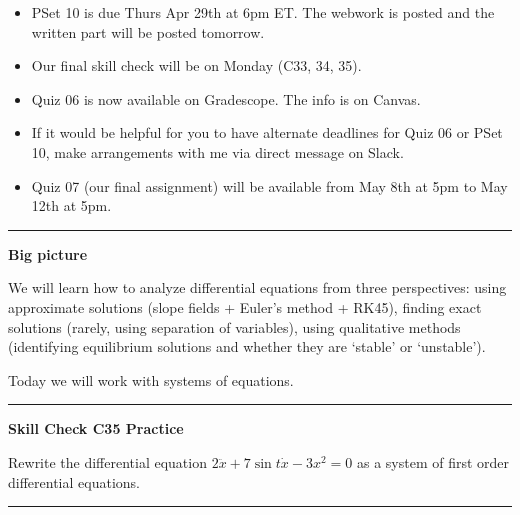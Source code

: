 \documentclass[12pt,letterpaper,noanswers]{exam}
\begin{document}
 \pdfpageheight 11in 
  \pdfpagewidth 8.5in





\begin{itemize}
\itemsep0em
\item PSet 10 is due Thurs Apr 29th at 6pm ET.  The webwork is posted and the written part will be posted tomorrow.
\item Our final skill check will be on Monday (C33, 34, 35).
\item Quiz 06 is now available on Gradescope.  The info is on Canvas.
\item If it would be helpful for you to have alternate deadlines for Quiz 06 or PSet 10, make arrangements with me via direct message on Slack.
\item Quiz 07 (our final assignment) will be available from May 8th at 5pm to May 12th at 5pm.
\end{itemize}

\hrule
\vspace{0.2cm}


\noindent\textbf{Big picture}

We will learn how to analyze differential equations from three perspectives: using approximate solutions (slope fields + Euler's method + RK45), finding exact solutions (rarely, using separation of variables), using qualitative methods (identifying equilibrium solutions and whether they are `stable' or `unstable').

Today we will work with systems of equations.

\vspace{0.2cm}
\hrule
\vspace{0.2cm}


\noindent\textbf{Skill Check C35 Practice}

 Rewrite the differential equation $2\ddot x + 7\sin t\dot x - 3x^2 = 0$ as a system of first order differential equations. 

\vspace{0.2cm}
\hrule
\vspace{0.2cm}
\end{document}
